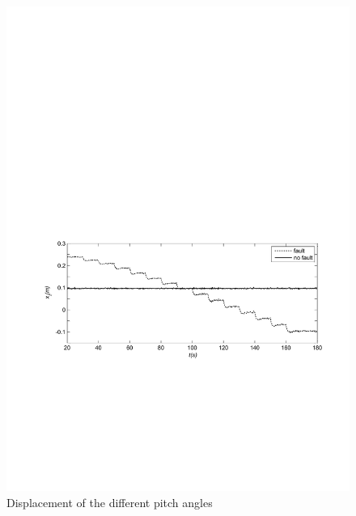 \documentclass{article}
\begin{document}
\begin{figure}[H]
  \centering
  \includegraphics[width=0.8\hsize]{MATLAB-fault25.pdf}
  \caption{Displacement of the different pitch angles}
  \label{fig:fault25}
\end{figure}
\end{document}
